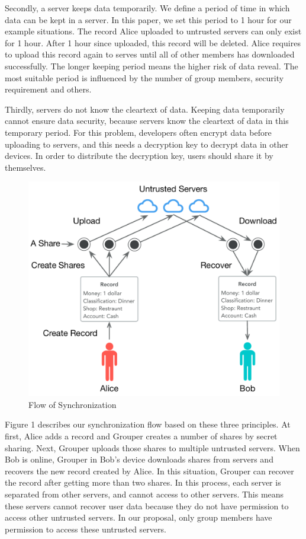\documentclass[twocolumn,10pt]{article}
\begin{document}
Secondly, a server keeps data temporarily. We define a period of time in which data can be kept in a server. In this paper, we set this period to 1 hour for our example situations. The record Alice uploaded to untrusted servers can only exist for 1 hour. After 1 hour since uploaded, this record will be deleted. Alice requires to upload this record again to serves until all of other members has downloaded successfully. The longer keeping period means the higher risk of data reveal. The most suitable period is influenced by the number of group members, security requirement and others. 

Thirdly, servers do not know the cleartext of data. Keeping data temporarily cannot ensure data security, because servers know the cleartext of data in this temporary period. For this problem, developers often encrypt data before uploading to servers, and this needs a decryption key to decrypt data in other devices. In order to distribute the decryption key, users should share it by themselves.

\begin{figure}[t]
\centering
\includegraphics[scale=0.35]{sync_flow}
\caption{Flow of Synchronization}
\end{figure}

Figure 1 describes our synchronization flow based on these three principles. At first, Alice adds a record and Grouper creates a number of shares by secret sharing. Next, Grouper uploads those shares to multiple untrusted servers. When Bob is online, Grouper in Bob's device downloads shares from servers and recovers the new record created by Alice. In this situation, Grouper can recover the record after getting more than two shares. In this process, each server is separated from other servers, and cannot access to other servers. This means these servers cannot recover user data because they do not have permission to access other untrusted servers. In our proposal, only group members have permission to access these untrusted servers.
\end{document}
